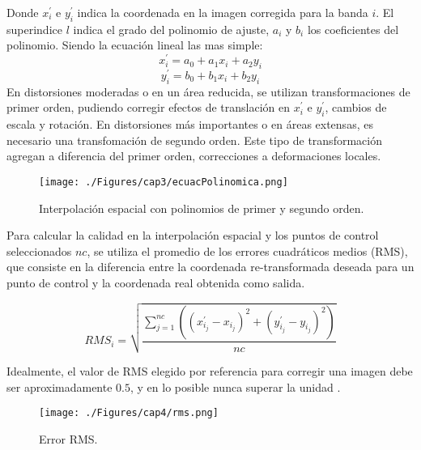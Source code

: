 
Donde $ x^{'}_{i} $ e $ y^{'}_{i} $ indica la coordenada en la imagen corregida para la banda $ i $. El superindice $ l $ indica el grado del polinomio de ajuste, $ a_{i} $ y $ b_{i} $ los coeficientes del polinomio. Siendo la ecuaci\'on lineal las mas simple:
	\begin{equation}
	x^{'}_{i} = a_{0}+a_{1}x_{i}+a_{2}y_{i}
	\end{equation} 
		\begin{equation}
		y^{'}_{i} = b_{0}+b_{1}x_{i}+b_{2}y_{i}
		\end{equation} 
En distorsiones moderadas o en un \'area reducida, se utilizan transformaciones de primer orden, pudiendo corregir efectos de translaci\'on en $ x^{'}_{i} $ e $ y^{'}_{i} $, cambios de escala y rotaci\'on.
En distorsiones m\'as importantes o en \'areas extensas, es necesario una transfomaci\'on de segundo orden. Este tipo de transformaci\'on agregan a diferencia del primer orden, correcciones a deformaciones locales.
    \begin{figure}[H]
    	\centering
    	\texttt{[image: ./Figures/cap3/ecuacPolinomica.png]}
    	\caption{Interpolaci\'on espacial con polinomios de primer y segundo orden.}
    	\label{fig:intPolEcua}
    \end{figure}
 Para calcular la calidad en la interpolaci\'on espacial y los puntos de control seleccionados $ nc $, se utiliza el promedio de los errores cuadráticos medios (RMS), que consiste en la diferencia entre la coordenada re-transformada deseada para un punto de control y la coordenada real obtenida como salida.

 \begin{equation}
 RMS_{i} = \sqrt{\dfrac{\sum_{j=1}^{nc} ((x_{i_{j}}^{'}-x_{i_{j}})^{2}+(y_{i_{j}}^{'}-y_{i_{j}})^{2})}{nc}}
 \end{equation} 

 	Idealmente, el valor de RMS elegido por referencia para corregir una imagen debe ser aproximadamente $ 0.5 $, y en lo posible nunca superar la unidad \cite{guide1999erdas}.
 
 
     \begin{figure}[H]
     	\centering
     	\texttt{[image: ./Figures/cap4/rms.png]}
     	\caption{Error RMS.}
     	\label{fig:rms}
     \end{figure}



